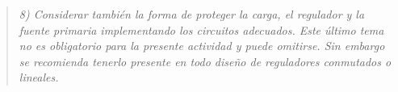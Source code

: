 \begin{quote} \textit{8) Considerar también la forma de proteger la carga, el regulador y la fuente primaria implementando los circuitos adecuados. Este último tema no es obligatorio para la presente actividad y puede omitirse. Sin embargo se recomienda tenerlo presente en todo diseño de reguladores conmutados o lineales.}
\end{quote}

